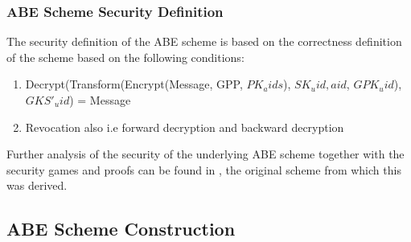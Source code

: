 \subsubsection*{ABE Scheme Security Definition}

The security definition of the ABE scheme is based on the correctness definition of the scheme based on the following conditions:

\begin{enumerate}[label=(\arabic*)]
	\item Decrypt(Transform(Encrypt(Message, GPP, $PK_aids$), $SK_uid,aid$, $GPK_uid$), $GKS'_uid$) = Message
	
	\item Revocation also i.e forward decryption and backward decryption
\end{enumerate}


Further analysis of the security of the underlying ABE scheme together with the security games and proofs can be found in \cite{Yang2014}, the original scheme from which this was derived.


\subsection{ABE Scheme Construction}


